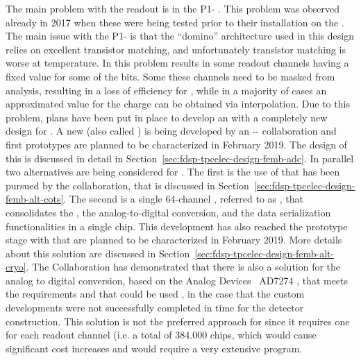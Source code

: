 The main problem with the   readout is in the
P1- . This problem was observed already in 2017
when these  were being tested prior to their installation
on the . The main issue with the P1- is 
that the ``domino'' architecture used in this design relies on
excellent transistor matching, and unfortunately transistor matching
is worse at  temperature. In  this problem
results in some readout channels having a fixed value for some of
the  bits. Some these channels need to be masked 
from analysis, resulting in a loss of efficiency for , while
in a majority of cases an approximated value for the charge can
be obtained via interpolation. Due to this problem, plans have
been put in place to develop an  with a completely new
design for . A new   (also called 
 ) is being developed by an 
-- collaboration and first
prototypes are planned to be characterized in February 2019. The design
of this  is discussed in detail in 
Section~\ref{sec:fdsp-tpcelec-design-femb-adc}. In parallel two
alternatives are being considered for . The first is the
use of   that has been pursued by the 
 collaboration, that is discussed in 
Section~\ref{sec:fdsp-tpcelec-design-femb-alt-cots}. The second is
a single \num{64}-channel , referred to as ,
that consolidates the , the analog-to-digital conversion, and the
data serialization functionalities in a single chip. This 
development has also reached the prototype stage with 
that are planned to be characterized in February 2019. More details about this
solution are discussed in Section~\ref{sec:fdsp-tpcelec-design-femb-alt-cryo}.
The  Collaboration has demonstrated that there is also
a  solution for the analog to digital conversion, based
on the Analog Devices~\cite{AnalogDevices} AD7274 , that meets the 
requirements and that could be used , in the
case that the custom  developments were not successfully
completed in time for the detector construction. This 
solution is not the preferred approach for  since it
requires one  for each readout channel (i.e. a total
of \num{384,000} chips, which would cause significant cost increases
and would require a very extensive  program.

